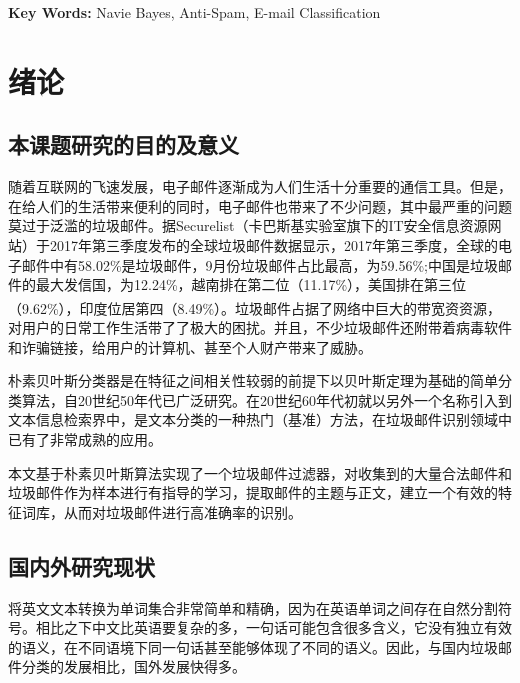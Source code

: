 \documentclass[UTF8,zihao=-4]{ctexart}
\newcommand{\upcite}[1]{\textsuperscript{\cite{#1}}}
\begin{document}
  \noindent{}\textbf{Key Words: }Navie Bayes, Anti-Spam, E-mail Classification
\newpage

\linespread{1.25}
\tableofcontents
\newpage

\songti{}
\newpage
\section{绪论}
\subsection{本课题研究的目的及意义}
随着互联网的飞速发展，电子邮件逐渐成为人们生活十分重要的通信工具。但是，在给人们的生活带来便利的同时，电子邮件也带来了不少问题，其中最严重的问题莫过于泛滥的垃圾邮件。据Securelist（卡巴斯基实验室旗下的IT安全信息资源网站）于2017年第三季度发布的全球垃圾邮件数据显示，2017年第三季度，全球的电子邮件中有58.02\%是垃圾邮件，9月份垃圾邮件占比最高，为59.56\%;中国是垃圾邮件的最大发信国，为12.24\%，越南排在第二位（11.17\%），美国排在第三位（9.62\%），印度位居第四（8.49\%）\upcite{securelist}。垃圾邮件占据了网络中巨大的带宽资资源，对用户的日常工作生活带了了极大的困扰。并且，不少垃圾邮件还附带着病毒软件和诈骗链接，给用户的计算机、甚至个人财产带来了威胁。

朴素贝叶斯分类器是在特征之间相关性较弱的前提下以贝叶斯定理为基础的简单分类算法，自20世纪50年代已广泛研究。在20世纪60年代初就以另外一个名称引入到文本信息检索界中，是文本分类的一种热门（基准）方法，在垃圾邮件识别领域中已有了非常成熟的应用。

本文基于朴素贝叶斯算法实现了一个垃圾邮件过滤器，对收集到的大量合法邮件和垃圾邮件作为样本进行有指导的学习，提取邮件的主题与正文，建立一个有效的特征词库，从而对垃圾邮件进行高准确率的识别。

\subsection{国内外研究现状}

将英文文本转换为单词集合非常简单和精确，因为在英语单词之间存在自然分割符号。相比之下中文比英语要复杂的多，一句话可能包含很多含义，它没有独立有效的语义，在不同语境下同一句话甚至能够体现了不同的语义。因此，与国内垃圾邮件分类的发展相比，国外发展快得多。
\end{document}
